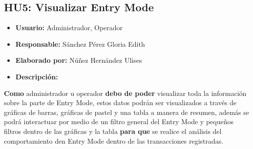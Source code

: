 \subsection{HU5: Visualizar Entry Mode}
\begin{itemize}
	\item \textbf{Usuario:} Administrador, Operador
	\item \textbf{Responsable:} Sánchez Pérez Gloria Edith
	\item \textbf{Elaborado por:} Núñez Hernández Ulises
	\item \textbf{Descripción:}
\end{itemize}
\textbf{Como} administrador u operador \textbf{debo de poder} visualizar toda la información sobre la parte de Entry Mode, estos datos podrán ser visualizados a través de gráficas de barras, gráficas de pastel y una tabla a manera de resumen, además se podrá interactuar por medio de un filtro general del Entry Mode y pequeños filtros dentro de las gráficas y la tabla \textbf{para que} se realice el análisis del comportamiento den Entry Mode dentro de las transacciones registradas. 